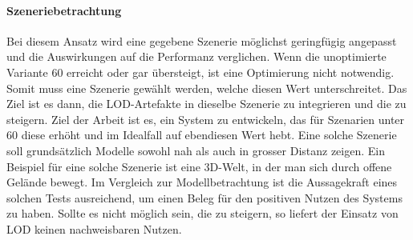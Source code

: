 \paragraph{Szeneriebetrachtung}
Bei diesem Ansatz wird eine gegebene Szenerie möglichst geringfügig angepasst und die Auswirkungen auf die Performanz verglichen.
Wenn die unoptimierte Variante 60  erreicht oder gar übersteigt, ist eine Optimierung nicht notwendig. Somit muss eine Szenerie gewählt werden, welche diesen Wert unterschreitet.
Das Ziel ist es dann, die LOD-Artefakte in dieselbe Szenerie zu integrieren und die  zu steigern. Ziel der Arbeit ist es, ein System zu entwickeln, das für Szenarien unter 60  diese erhöht und im Idealfall auf ebendiesen Wert hebt.
Eine solche Szenerie soll grundsätzlich Modelle sowohl nah als auch in grosser Distanz zeigen. Ein Beispiel für eine solche Szenerie ist eine 3D-Welt, in der man sich durch offene Gelände bewegt.
Im Vergleich zur Modellbetrachtung ist die Aussagekraft eines solchen Tests ausreichend, um einen Beleg für den positiven Nutzen des Systems zu haben. Sollte es nicht möglich sein, die  zu steigern, so liefert der Einsatz von LOD keinen nachweisbaren Nutzen.
